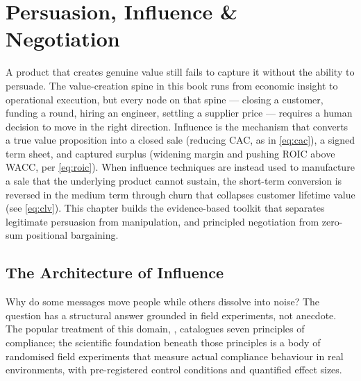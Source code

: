 \chapter{Persuasion, Influence \& Negotiation}\label{ch:persuasion-influence}


A product that creates genuine value still fails to capture it without the ability to
persuade. The value-creation spine in this book runs from economic insight to operational
execution, but every node on that spine --- closing a customer, funding a round, hiring an
engineer, settling a supplier price --- requires a human decision to move in the right
direction. Influence is the mechanism that converts a true value proposition into a closed
sale (reducing CAC, as in \cref{eq:cac}), a signed term sheet, and captured surplus
(widening margin and pushing ROIC above WACC, per \cref{eq:roic}). When influence
techniques are instead used to manufacture a sale that the underlying product cannot
sustain, the short-term conversion is reversed in the medium term through churn that
collapses customer lifetime value (see \cref{eq:clv}). This chapter builds the
evidence-based toolkit that separates legitimate persuasion from manipulation, and
principled negotiation from zero-sum positional bargaining.


\section{The Architecture of Influence}\label{sec:influence-principles}

Why do some messages move people while others dissolve into noise? The question has a
structural answer grounded in field experiments, not anecdote. The popular treatment
of this domain, \textcite{cialdini2021influence}, catalogues seven principles of compliance;
the scientific foundation beneath those principles is a body of randomised field
experiments that measure actual compliance behaviour in real environments, with
pre-registered control conditions and quantified effect sizes.

